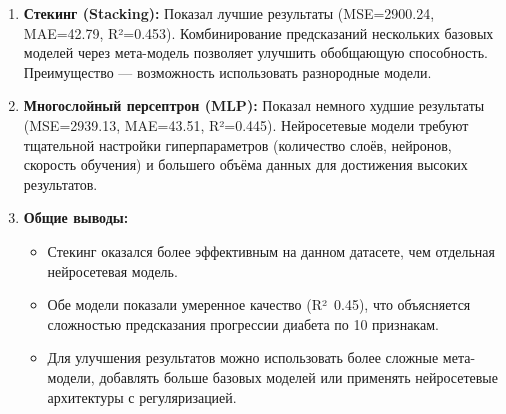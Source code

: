\documentclass[a4paper,12pt]{article}
\begin{document}
\begin{enumerate}
    \item \textbf{Стекинг (Stacking):} Показал лучшие результаты (MSE=2900.24, MAE=42.79, R²=0.453). Комбинирование предсказаний нескольких базовых моделей через мета-модель позволяет улучшить обобщающую способность. Преимущество — возможность использовать разнородные модели.
    
    \item \textbf{Многослойный персептрон (MLP):} Показал немного худшие результаты (MSE=2939.13, MAE=43.51, R²=0.445). Нейросетевые модели требуют тщательной настройки гиперпараметров (количество слоёв, нейронов, скорость обучения) и большего объёма данных для достижения высоких результатов.
    
    \item \textbf{Общие выводы:}
    \begin{itemize}
        \item Стекинг оказался более эффективным на данном датасете, чем отдельная нейросетевая модель.
        \item Обе модели показали умеренное качество (R²~0.45), что объясняется сложностью предсказания прогрессии диабета по 10 признакам.
        \item Для улучшения результатов можно использовать более сложные мета-модели, добавлять больше базовых моделей или применять нейросетевые архитектуры с регуляризацией.
    \end{itemize}
\end{enumerate}
\end{document}
